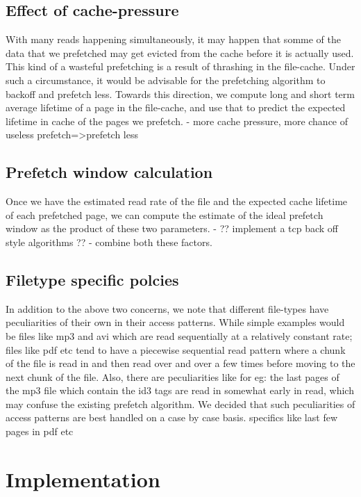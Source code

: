 \documentclass[twocolumn,10pt]{article}
\begin{document}
\subsection{Effect of cache-pressure}
With many reads happening simultaneously, it may happen that somme of the data that
we prefetched may get evicted from the cache before it is actually used. This kind of 
a wasteful prefetching is a result of thrashing in the file-cache. Under such a
circumstance, it would be advisable for the prefetching algorithm to backoff and prefetch
less. Towards this direction, we compute long and short term average lifetime of a 
page in the file-cache, and use that to predict the expected lifetime in cache of the
pages we prefetch.
	- more cache pressure, more chance of useless prefetch=>prefetch less

\subsection{Prefetch window calculation}
Once we have the estimated read rate of the file and the expected cache lifetime of
each prefetched page, we can compute the estimate of the ideal prefetch window as 
the product of these two parameters. 
        - ?? implement a tcp back off style algorithms ??
	- combine both these factors.

\subsection{Filetype specific polcies}
In addition to the above two concerns, we note that different file-types have peculiarities
of their own in their access patterns. While simple examples would be files like mp3 and
avi which are read sequentially at a relatively constant rate; files like pdf etc tend to
have a piecewise sequential read pattern where a chunk of the file is read in and then read
over and over a few times before moving to the next chunk of the file. Also, there are
peculiarities like for eg: the last pages of the mp3 file which contain the id3 tags are
read in somewhat early in read, which may confuse the existing prefetch algorithm. 
We decided that such peculiarities of access patterns are best handled on a case by case
basis.
	specifics like last few pages in pdf etc

\section{Implementation}
\end{document}
